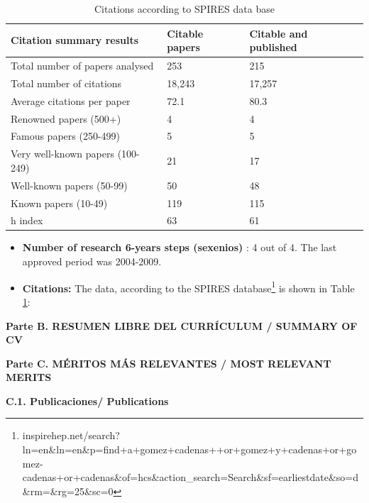 \documentclass[a4paper,11pt,oneside]{article}
\begin{document}
\begin{table}[h!]
\begin{center}
\caption{Citations according to SPIRES data base}
\begin{tabular}{| l | l | l | }
\hline
Citation summary results & Citable papers & Citable and published\\
\hline
Total number of papers analysed &	253	&215\\
Total number of citations &	18,243	& 17,257 \\
Average citations per paper &	72.1 &	80.3 \\
Renowned papers (500+)	 & 4	& 4 \\
Famous papers (250-499)	 & 5	& 5 \\
Very well-known papers (100-249) &	21 &	17\\
Well-known papers (50-99) &	50 &	48\\
Known papers (10-49) &	119	& 115\\
h index &63 &	61\\
\hline
\end{tabular}
\label{tab:spires}
\end{center}
\end{table} 

\begin{itemize}
\item {\bf Number of research 6-years steps (sexenios) }: 4 out of 4. The last approved period was 2004-2009. 
\item{\bf Citations:} The data, according to the SPIRES database\footnote{inspirehep.net/search?ln=en\&ln=en\&p=find+a+gomez+cadenas++or+gomez+y+cadenas+or+gomez-cadenas+or+cadenas\&of=hcs\&action\_search=Search\&sf=earliestdate\&so=d\&rm=\&rg=25\&sc=0} is shown in Table \ref{tab:spires}:
\end{itemize}

\noindent\textbf{Parte B. RESUMEN LIBRE DEL CURRÍCULUM / SUMMARY OF CV }


\vspace{12pt}

\noindent\textbf{Parte C. MÉRITOS MÁS RELEVANTES / MOST RELEVANT MERITS}

\vspace{6pt}
\noindent\textbf{C.1. Publicaciones/ Publications}


\end{document}
